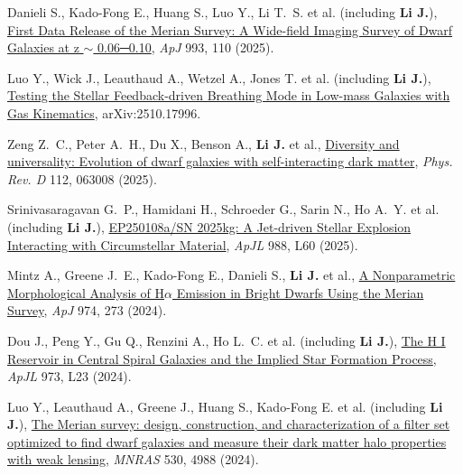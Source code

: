 {\item Danieli S., Kado-Fong E., Huang S., Luo Y., Li T.~S. et al. (including \textbf{Li J.}), \href{https://ui.adsabs.harvard.edu/abs/2025ApJ...993..110D}{First Data Release of the Merian Survey: A Wide-field Imaging Survey of Dwarf Galaxies at z {\ensuremath{\sim}} 0.06─0.10}, \textit{ApJ} 993, 110 (2025).

\item Luo Y., Wick J., Leauthaud A., Wetzel A., Jones T. et al. (including \textbf{Li J.}), \href{https://ui.adsabs.harvard.edu/abs/2025arXiv251017996L}{Testing the Stellar Feedback-driven Breathing Mode in Low-mass Galaxies with Gas Kinematics}, arXiv:2510.17996.

\item Zeng Z.~C., Peter A.~H., Du X., Benson A., \textbf{Li J.} et al., \href{https://ui.adsabs.harvard.edu/abs/2025PhRvD.112f3008Z}{Diversity and universality: Evolution of dwarf galaxies with self-interacting dark matter}, \textit{Phys. Rev. D} 112, 063008 (2025).

\item Srinivasaragavan G.~P., Hamidani H., Schroeder G., Sarin N., Ho A.~Y. et al. (including \textbf{Li J.}), \href{https://ui.adsabs.harvard.edu/abs/2025ApJ...988L..60S}{EP250108a/SN 2025kg: A Jet-driven Stellar Explosion Interacting with Circumstellar Material}, \textit{ApJL} 988, L60 (2025).

\item Mintz A., Greene J.~E., Kado-Fong E., Danieli S., \textbf{Li J.} et al., \href{https://ui.adsabs.harvard.edu/abs/2024ApJ...974..273M}{A Nonparametric Morphological Analysis of H{\ensuremath{\alpha}} Emission in Bright Dwarfs Using the Merian Survey}, \textit{ApJ} 974, 273 (2024).

\item Dou J., Peng Y., Gu Q., Renzini A., Ho L.~C. et al. (including \textbf{Li J.}), \href{https://ui.adsabs.harvard.edu/abs/2024ApJ...973L..23D}{The H I Reservoir in Central Spiral Galaxies and the Implied Star Formation Process}, \textit{ApJL} 973, L23 (2024).

\item Luo Y., Leauthaud A., Greene J., Huang S., Kado-Fong E. et al. (including \textbf{Li J.}), \href{https://ui.adsabs.harvard.edu/abs/2024MNRAS.530.4988L}{The Merian survey: design, construction, and characterization of a filter set optimized to find dwarf galaxies and measure their dark matter halo properties with weak lensing}, \textit{MNRAS} 530, 4988 (2024).

}
